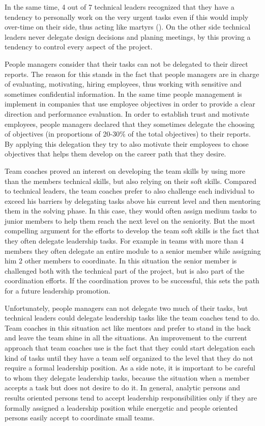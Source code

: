 In the same time, 4 out of 7 technical leaders recognized that they have a tendency to personally work on the very urgent tasks even if this would imply over-time on their side, thus acting like martyrs (\cite{toxic}). On the other side technical leaders never delegate design decisions and planing meetings, by this proving a tendency to control every aspect of the project. 

People managers consider that their tasks can not be delegated to their direct reports. The reason for this stands in the fact that people managers are in charge of evaluating, motivating, hiring employees, thus working with sensitive and sometimes confidential information. In the same time people management is implement in companies that use employee objectives in order to provide a clear direction and performance evaluation. In order to establish trust and motivate employees, people managers declared that they sometimes delegate the choosing of objectives (in proportions of 20-30\% of the total objectives) to their reports. By applying this delegation they try to also motivate their employees to chose objectives that helps them develop on the career path that they desire.

Team coaches proved an interest on developing the team skills by using more than the members technical skills, but also relying on their soft skills. Compared to technical leaders, the team coaches prefer to also challenge each individual to exceed his barriers by delegating tasks above his current level and then mentoring them in the solving phase. In this case, they would often assign medium tasks to junior members to help them reach the next level on the seniority. But the most compelling argument for the efforts to develop the team soft skills is the fact that they often delegate leadership tasks. For example in teams with more than 4 members they often delegate an entire module to a senior member while assigning him 2 other members to coordinate. In this situation the senior member is challenged both with the technical part of the project, but is also part of the coordination efforts. If the coordination proves to be successful, this sets the path for a future leadership promotion.

Unfortunately, people managers can not delegate two much of their tasks, but technical leaders could delegate leadership tasks like the team coaches tend to do. Team coaches in this situation act like mentors and prefer to stand in the back and leave the team shine in all the situations. An improvement to the current approach that team coaches use is the fact that they could start delegation each kind of tasks until they have a team self organized to the level that they do not require a formal leadership position. As a side note, it is important to be careful to whom they delegate leadership tasks, because the situation when a member accepts a task but does not desire to do it. 
In general, analytic persons and results oriented persons tend to accept leadership responsibilities only if they are formally assigned a leadership position while energetic and people oriented persons easily accept to coordinate small teams.

